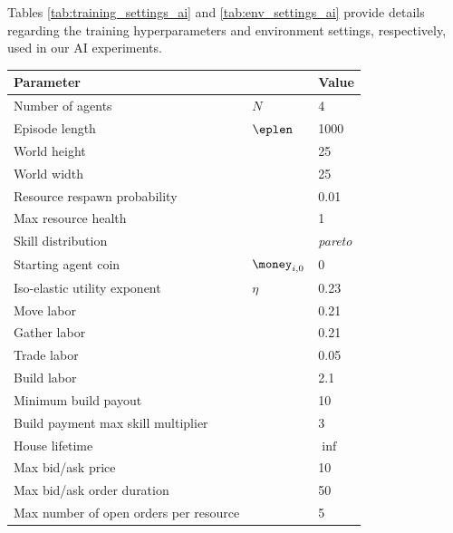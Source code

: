 Tables \ref{tab:training_settings_ai} and \ref{tab:env_settings_ai} provide details regarding the training hyperparameters and environment settings, respectively, used in our AI experiments.
\begin{table}[ht!]
    \begin{small}
        \begin{center}
            \begin{tabular}[c]{lll}
                Parameter & & Value \\
                \hline
                \hline

                Number of agents & $N$ & 4 \\
                Episode length & $\eplen$ & 1000 \\
                World height & & 25 \\
                World width & & 25 \\
                Resource respawn probability & & 0.01 \\
                Max resource health & & 1 \\
                Skill distribution & & \textit{pareto} \\
                Starting agent coin & $\money_{i, 0} $ & 0 \\



                \hline

                Iso-elastic utility exponent & $\eta$ & 0.23 \\
                Move labor & & 0.21 \\
                Gather labor & & 0.21 \\
                Trade labor & & 0.05 \\
                Build labor & & 2.1 \\

                \hline

                Minimum build payout & & 10 \\
                Build payment max skill multiplier & & 3 \\
                House lifetime & & $\inf$ \\

                \hline

                Max bid/ask price & & 10 \\
                Max bid/ask order duration & & 50 \\
                Max number of open orders per resource & & 5 \\


\end{tabular}
\end{center}
\end{small}
\end{table}
